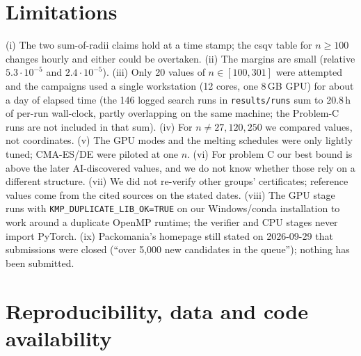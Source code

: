 \documentclass[10pt]{article}
\begin{document}
\section{Limitations}
(i) The two sum-of-radii claims hold at a time stamp; the csqv table for $n\ge100$ changes hourly and either could be overtaken. (ii) The margins are small (relative $5.3\cdot10^{-5}$ and $2.4\cdot10^{-5}$). (iii) Only 20 values of $n\in[100,301]$ were attempted and the campaigns used a single workstation (12 cores, one 8\,GB GPU) for about a day of elapsed time (the 146 logged search runs in \texttt{results/runs} sum to 20.8\,h of per-run wall-clock, partly overlapping on the same machine; the Problem-C runs are not included in that sum). (iv) For $n\ne27,120,250$ we compared values, not coordinates. (v) The GPU modes and the melting schedules were only lightly tuned; CMA-ES/DE were piloted at one $n$. (vi) For problem C our best bound is above the later AI-discovered values, and we do not know whether those rely on a different structure. (vii) We did not re-verify other groups' certificates; reference values come from the cited sources on the stated dates. (viii) The GPU stage runs with \texttt{KMP\_DUPLICATE\_LIB\_OK=TRUE} on our Windows/conda installation to work around a duplicate OpenMP runtime; the verifier and CPU stages never import PyTorch. (ix) Packomania's homepage still stated on 2026-09-29 that submissions were closed (``over 5,000 new candidates in the queue''); nothing has been submitted.

\section{Reproducibility, data and code availability}\label{sec:repro}
\end{document}
